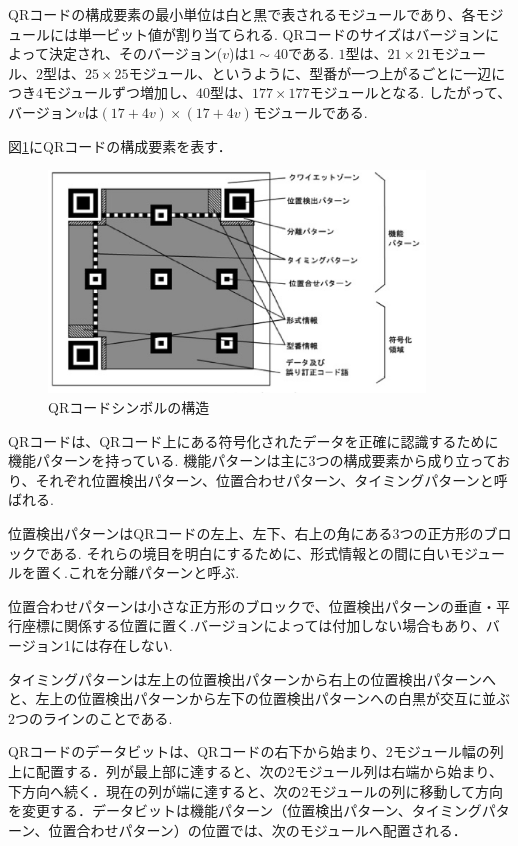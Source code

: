 \documentclass{thesis}
\begin{document}
QRコードの構成要素の最小単位は白と黒で表されるモジュールであり、各モジュールには単一ビット値が割り当てられる.
QRコードのサイズはバージョンによって決定され、そのバージョン($v$)は$1\sim40$である.
$1$型は、$21\times21$モジュール、$2$型は、$25\times25$モジュール、というように、型番が一つ上がるごとに一辺につき$4$モジュールずつ増加し、$40$型は、$177\times177$モジュールとなる.
したがって、バージョン$v$は$(17+4v)\times(17+4v)$モジュールである.

図\ref{fig:qrcode_config}にQRコードの構成要素を表す． \\

\begin{figure}[H]
\centering
\includegraphics[width=10cm,clip]{pic/qrcode_config.eps}
\caption{QRコードシンボルの構造\cite{jis}}
\label{fig:qrcode_config}
\end{figure}

QRコードは、QRコード上にある符号化されたデータを正確に認識するために機能パターンを持っている.
機能パターンは主に3つの構成要素から成り立っており、それぞれ位置検出パターン、位置合わせパターン、タイミングパターンと呼ばれる.

位置検出パターンはQRコードの左上、左下、右上の角にある3つの正方形のブロックである.
それらの境目を明白にするために、形式情報との間に白いモジュールを置く.これを分離パターンと呼ぶ.

位置合わせパターンは小さな正方形のブロックで、位置検出パターンの垂直・平行座標に関係する位置に置く.バージョンによっては付加しない場合もあり、バージョン1には存在しない.

タイミングパターンは左上の位置検出パターンから右上の位置検出パターンへと、左上の位置検出パターンから左下の位置検出パターンへの白黒が交互に並ぶ$2$つのラインのことである.

QRコードのデータビットは、QRコードの右下から始まり、2モジュール幅の列上に配置する．列が最上部に達すると、次の2モジュール列は右端から始まり、下方向へ続く．現在の列が端に達すると、次の2モジュールの列に移動して方向を変更する．データビットは機能パターン（位置検出パターン、タイミングパターン、位置合わせパターン）の位置では、次のモジュールへ配置される．
\end{document}
